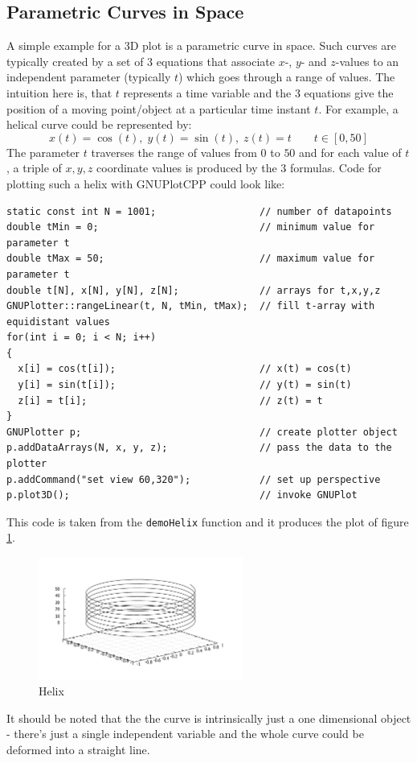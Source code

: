 \documentclass[11pt]{article}
\begin{document}
\subsection{Parametric Curves in Space}
A simple example for a 3D plot is a parametric curve in space. Such curves are typically created by a set of 3 equations that associate $x$-, $y$- and $z$-values to an independent parameter (typically $t$) which goes through a range of values. The intuition here is, that $t$ represents a time variable and the 3 equations give the position of a moving point/object at a particular time instant $t$. For example, a helical curve could be represented by:
\begin{equation}
	x(t) = \cos(t), \; y(t) = \sin(t), \; z(t) = t \qquad t \in [0, 50]
\end{equation}
The parameter $t$ traverses the range of values from $0$ to $50$ and for each value of $t$, a triple of $x,y,z$ coordinate values is produced by the 3 formulas. Code for plotting such a helix with GNUPlotCPP could look like:
\begin{verbatim}
static const int N = 1001;                  // number of datapoints
double tMin = 0;                            // minimum value for parameter t
double tMax = 50;                           // maximum value for parameter t
double t[N], x[N], y[N], z[N];              // arrays for t,x,y,z
GNUPlotter::rangeLinear(t, N, tMin, tMax);  // fill t-array with equidistant values
for(int i = 0; i < N; i++)
{
  x[i] = cos(t[i]);                         // x(t) = cos(t)
  y[i] = sin(t[i]);                         // y(t) = sin(t)
  z[i] = t[i];                              // z(t) = t
}
GNUPlotter p;                               // create plotter object
p.addDataArrays(N, x, y, z);                // pass the data to the plotter
p.addCommand("set view 60,320");            // set up perspective
p.plot3D();                                 // invoke GNUPlot
\end{verbatim}
This code is taken from the \texttt{demoHelix} function and it produces the plot of figure \ref{fig:Helix}.
\begin{figure}[h!]
	\centering
  	\includegraphics[width=0.60\textwidth]{Plots/Helix.pdf}
	\caption{Helix}
	\label{fig:Helix}
\end{figure}
It should be noted that the the curve is intrinsically just a one dimensional object - there's just a single independent variable and the whole curve could be deformed into a straight line.
\end{document}
